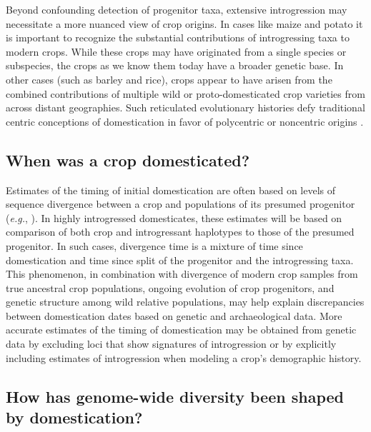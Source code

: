 \documentclass[11pt]{article}
\begin{document}
{Beyond confounding detection of progenitor taxa, extensive introgression may necessitate a more nuanced view of crop origins.
In cases like maize and potato it is important to recognize the substantial contributions of introgressing taxa to modern crops.
While these crops may have originated from a single species or subspecies, the crops as we know them today have a broader genetic base.
In other cases (such as barley and rice), crops appear to have arisen from the combined contributions of multiple wild or proto-domesticated crop varieties from across distant geographies.
Such reticulated evolutionary histories defy traditional centric conceptions of domestication in favor of polycentric or noncentric origins \cite{allaby2015barley}.

\subsection*{When was a crop domesticated?}
Estimates of the timing of initial domestication are often based on levels of sequence divergence between a crop and populations of its presumed progenitor (\emph{e.g.}, \citep{matsuoka2002single, molina2011molecular}).
In highly introgressed domesticates, these estimates will be based on comparison of both crop and introgressant haplotypes to those of the presumed progenitor.
In such cases, divergence time is a mixture of time since domestication and time since split of the progenitor and the introgressing taxa.
This phenomenon, in combination with divergence of modern crop samples from true ancestral crop populations, ongoing evolution of crop progenitors, and genetic structure among wild relative populations, may help explain discrepancies between domestication dates based on genetic and archaeological data.
More accurate estimates of the timing of domestication may be obtained from genetic data by excluding loci that show signatures of introgression or by explicitly including estimates of introgression when modeling a crop's demographic history.

\subsection*{How has genome-wide diversity been shaped by domestication?}

}
\end{document}
